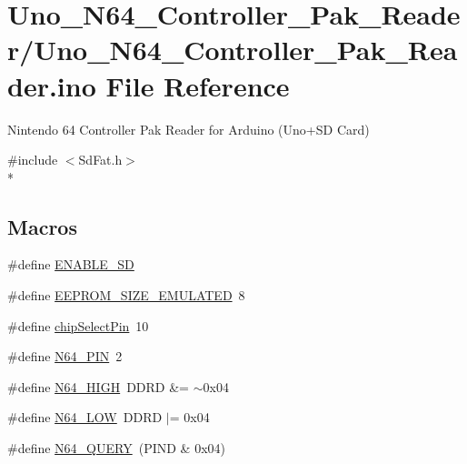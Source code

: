 \hypertarget{Uno__N64__Controller__Pak__Reader_8ino}{\section{Uno\-\_\-\-N64\-\_\-\-Controller\-\_\-\-Pak\-\_\-\-Reader/\-Uno\-\_\-\-N64\-\_\-\-Controller\-\_\-\-Pak\-\_\-\-Reader.ino File Reference}
\label{Uno__N64__Controller__Pak__Reader_8ino}
}


Nintendo 64 Controller Pak Reader for Arduino (Uno+\-S\-D Card)  


{\ttfamily \#include $<$Sd\-Fat.\-h$>$}\\*
\subsection*{Macros}
\begin{DoxyCompactItemize}
\item 
\#define \hyperlink{Uno__N64__Controller__Pak__Reader_8ino_aad3906e035d4d15e93d608f44643a226}{E\-N\-A\-B\-L\-E\-\_\-\-S\-D}
\item 
\#define \hyperlink{Uno__N64__Controller__Pak__Reader_8ino_aec9878d07ac90b1d1298c09c9a0ddea3}{E\-E\-P\-R\-O\-M\-\_\-\-S\-I\-Z\-E\-\_\-\-E\-M\-U\-L\-A\-T\-E\-D}~8
\item 
\#define \hyperlink{Uno__N64__Controller__Pak__Reader_8ino_ad5634c2f36664cefb9172580579743a0}{chip\-Select\-Pin}~10
\item 
\#define \hyperlink{Uno__N64__Controller__Pak__Reader_8ino_a3283890a957c4bb5f76e7ccbcab83a0c}{N64\-\_\-\-P\-I\-N}~2
\item 
\#define \hyperlink{Uno__N64__Controller__Pak__Reader_8ino_aa28f593e3f94fbdc4cf2c3577a712b3f}{N64\-\_\-\-H\-I\-G\-H}~D\-D\-R\-D \&= $\sim$0x04
\item 
\#define \hyperlink{Uno__N64__Controller__Pak__Reader_8ino_a7c8723faf29cf8c164b672efcb620cbf}{N64\-\_\-\-L\-O\-W}~D\-D\-R\-D $\vert$= 0x04
\item 
\#define \hyperlink{Uno__N64__Controller__Pak__Reader_8ino_a4884a3ffe7033958f8ba619acb6a8366}{N64\-\_\-\-Q\-U\-E\-R\-Y}~(P\-I\-N\-D \& 0x04)
\end{DoxyCompactItemize}
